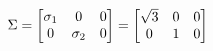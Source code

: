 \documentclass[preview]{standalone}
\begin{document}
\begin{align*}
\special{dvisvgm:raw <g id='unique000'>}\Sigma = \begin{bmatrix} \sigma_1 & 0 & 0 \\ 0 & \sigma_2 & 0 \end{bmatrix} = \begin{bmatrix} \sqrt{3} & 0 & 0 \\ 0 & 1 & 0 \end{bmatrix}\special{dvisvgm:raw </g>}
\end{align*}
\end{document}
